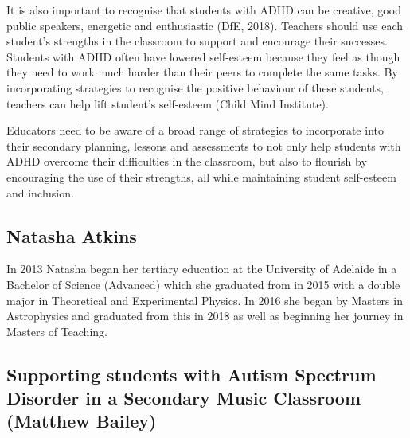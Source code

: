 \documentclass[twoside,14pt,a4paper,notitlepage]{memoir}
\begin{document}
It is also important to recognise that students with ADHD can be creative, good public speakers, energetic and enthusiastic (DfE, 2018). Teachers should use each student’s strengths in the classroom to support and encourage their successes. Students with ADHD often have lowered self-esteem because they feel as though they need to work much harder than their peers to complete the same tasks. By incorporating strategies to recognise the positive behaviour of these students, teachers can help lift student’s self-esteem (Child Mind Institute).

Educators need to be aware of a broad range of strategies to incorporate into their secondary planning, lessons and assessments to not only help students with ADHD overcome their difficulties in the classroom, but also to flourish by encouraging the use of their strengths, all while maintaining student self-esteem and inclusion.

\subsection*{Natasha Atkins}

In 2013 Natasha began her tertiary education at the University of Adelaide in a Bachelor of Science (Advanced) which she graduated from in 2015 with a double major in Theoretical and Experimental Physics. In 2016 she began by Masters in Astrophysics and graduated from this in 2018 as well as beginning her journey in Masters of Teaching. 



\subsection*{Supporting students with Autism Spectrum Disorder in a Secondary Music Classroom (Matthew Bailey)}
\label{aut:bailey}
\end{document}

